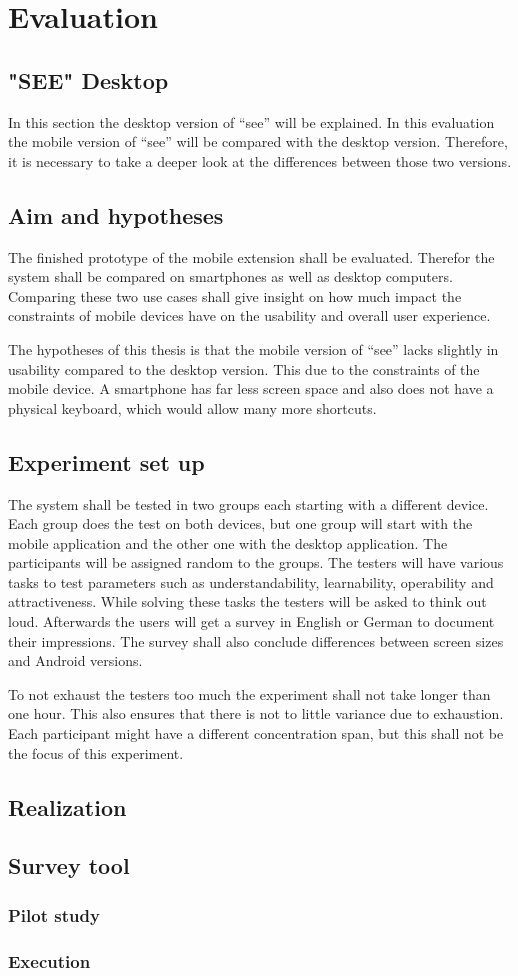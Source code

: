 \section{Evaluation}

\subsection{"SEE" Desktop}
In this section the desktop version of \enquote{\gls{see}} will be explained. 
In this evaluation the mobile version of \enquote{\gls{see}} will be compared with the desktop version.
Therefore, it is necessary to take a deeper look at the differences between those two versions.

\subsection{Aim and hypotheses}
The finished prototype of the mobile extension shall be evaluated. 
Therefor the system shall be compared on smartphones as well as desktop computers. 
Comparing these two use cases shall give insight on how much impact the constraints of mobile devices have on the usability and overall user experience.

The hypotheses of this thesis is that the mobile version of \enquote{\gls{see}} lacks slightly in usability compared to the desktop version.
This due to the constraints of the mobile device. 
A smartphone has far less screen space and also does not have a physical keyboard, which would allow many more shortcuts.
\subsection{Experiment set up}
The system shall be tested in two groups each starting with a different device. 
Each group does the test on both devices, but one group will start with the mobile application and the other one with the desktop application.
The participants will be assigned random to the groups.
The testers will have various tasks to test parameters such as understandability, learnability, operability and attractiveness. 
While solving these tasks the testers will be asked to think out loud. 
Afterwards the users will get a survey in English or German to document their impressions.
The survey shall also conclude differences between screen sizes and Android versions. 

To not exhaust the testers too much the experiment shall not take longer than one hour. 
This also ensures that there is not to little variance due to exhaustion.
Each participant might have a different concentration span, but this shall not be the focus of this experiment. 

\subsection{Realization}
\subsection{Survey tool}
\subsubsection{Pilot study}
\subsubsection{Execution}